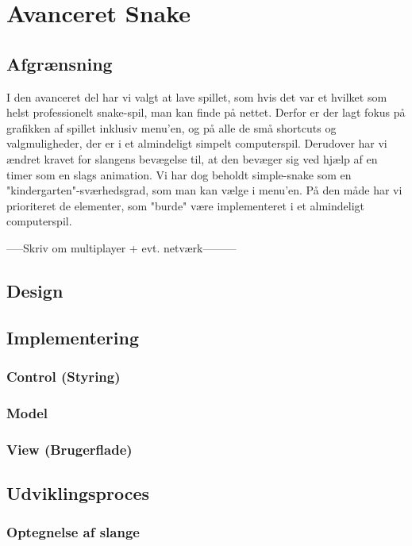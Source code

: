 \documentclass{report}
\begin{document}
\chapter{Avanceret Snake}
\section{Afgrænsning}
I den avanceret del har vi valgt at lave spillet, som hvis det var et hvilket som helst professionelt snake-spil, man kan finde på nettet. Derfor er der lagt fokus på grafikken af spillet inklusiv menu'en, og på alle de små shortcuts og valgmuligheder, der er i et almindeligt simpelt computerspil. Derudover har vi ændret kravet for slangens bevægelse til, at den bevæger sig ved hjælp af en timer som en slags animation. Vi har dog beholdt simple-snake som en "kindergarten"-sværhedsgrad, som man kan vælge i menu'en.
På den måde har vi prioriteret de elementer, som "burde" være implementeret i et almindeligt computerspil. 

-----Skriv om multiplayer + evt. netværk---------
\section{Design}

\section{Implementering}

\subsection{Control (Styring)}

\subsection{Model}

\subsection{View (Brugerflade)}


\section{Udviklingsproces}

\subsection{Optegnelse af slange}
\end{document}
